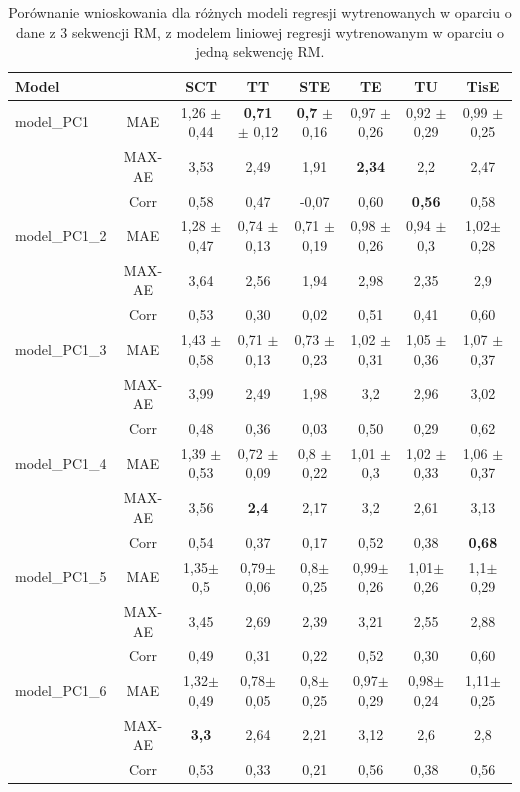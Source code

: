 \begin{table}[h!]
	\caption{Porównanie wnioskowania dla różnych modeli regresji wytrenowanych w oparciu o dane z 3 sekwencji RM, z modelem liniowej regresji wytrenowanym w oparciu o jedną sekwencję RM.}
	\scriptsize
	\begin{center}
		\begin{tabular}{lc||c|c|c|c|c|c}
			\textbf{Model} & & \textbf{SCT} & \textbf{TT} & \textbf{STE} & \textbf{TE} & \textbf{TU} & \textbf{TisE}\\ 
			
			\hline \hline
			model\_PC1 & MAE & 1,26 $\pm$ 0,44 & \textbf{0,71} $\pm$ 0,12 & \textbf{0,7} $\pm$ 0,16 & 0,97 $\pm$ 0,26 & 0,92 $\pm$ 0,29 & 0,99 $\pm$ 0,25\\
			&MAX-AE &3,53&2,49&1,91&\textbf{2,34}&2,2&2,47\\
			&Corr &0,58&0,47&-0,07&0,60&\textbf{0,56}&0,58\\
			
			\hline
			model\_PC1\_2 & MAE & 1,28 $\pm$ 0,47 & 0,74 $\pm$ 0,13 & 0,71 $\pm$ 0,19 & 0,98 $\pm$ 0,26 & 0,94 $\pm$ 0,3 & 1,02$\pm$ 0,28\\
			&MAX-AE &3,64&2,56&1,94&2,98&2,35&2,9\\
			&Corr &0,53&0,30&0,02&0,51&0,41&0,60\\
			
			\hline
			model\_PC1\_3&MAE & 1,43 $\pm$ 0,58 & 0,71 $\pm$ 0,13 & 0,73 $\pm$ 0,23 & 1,02 $\pm$ 0,31 & 1,05 $\pm$ 0,36 & 1,07 $\pm$ 0,37\\
			&MAX-AE &3,99&2,49&1,98&3,2&2,96&3,02\\
			&Corr &0,48&0,36&0,03&0,50&0,29&0,62\\
			
			\hline
			model\_PC1\_4&MAE & 1,39 $\pm$ 0,53 & 0,72 $\pm$ 0,09 & 0,8 $\pm$ 0,22 & 1,01 $\pm$ 0,3 & 1,02 $\pm$ 0,33 & 1,06 $\pm$ 0,37\\
			&MAX-AE &3,56&\textbf{2,4}&2,17&3,2&2,61&3,13\\
			&Corr &0,54&0,37&0,17&0,52&0,38&\textbf{0,68}\\
			
			\hline
			model\_PC1\_5&MAE & 1,35$\pm$ 0,5 & 0,79$\pm$0,06 &0,8$\pm$0,25 &0,99$\pm$0,26 &1,01$\pm$0,26 &1,1$\pm$0,29\\
			&MAX-AE &3,45&2,69&2,39&3,21&2,55&2,88\\
			&Corr &0,49&0,31&0,22&0,52&0,30&0,60\\
			
			\hline
			model\_PC1\_6&MAE & 1,32$\pm$0,49 & 0,78$\pm$0,05 &0,8$\pm$0,25& 0,97$\pm$0,29 & 0,98$\pm$0,24 &1,11$\pm$0,25\\
			&MAX-AE &\textbf{3,3}&2,64&2,21&3,12&2,6&2,8\\
			&Corr &0,53&0,33&0,21&0,56&0,38&0,56\\
			

\end{tabular}
\end{center}
\end{table}
